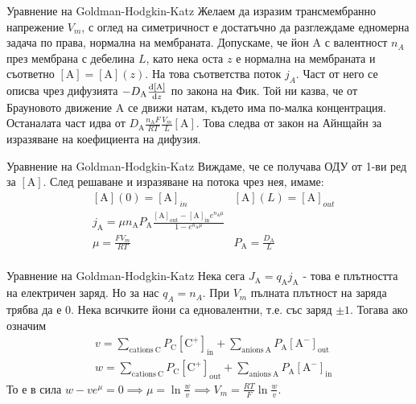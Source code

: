 \begin{frame}[t]{Уравнение на Goldman-Hodgkin-Katz}
    Желаем да изразим трансмембранно напрежение $V_m$, с оглед на симетричност е достатъчно да разглеждаме едномерна задача по права, нормална на мембраната.
    Допускаме, че йон $\mathrm{A}$ с валентност $n_A$ през мембрана с дебелина $L$, като нека оста $z$ е нормална на мембраната и съответно $\left[\mathrm{A}\right]=\left[\mathrm{A}\right](z)$. 
    На това съответства поток $j_A$. Част от него се описва чрез дифузията $-D_{\mathrm{A}}\dv{\left[{\mathrm{A}}\right]}{z}$ по закона на Фик.
    Той ни казва, че от Брауновото движение $\mathrm{A}$ се движи натам, където има по-малка концентрация.
    Останалата част идва от $D_{\mathrm{A}}\frac{n_{\mathrm{A}}F}{RT}\frac{V_m}{L}\left[\mathrm{A}\right]$. 
    Това следва от закон на Айнщайн за изразяване на коефициента на дифузия.
\end{frame}   

\begin{frame}[t]{Уравнение на Goldman-Hodgkin-Katz}
    Виждаме, че се получава ОДУ от 1-ви ред за $\left[\mathrm{A}\right]$. След решаване и изразяване на потока чрез нея, имаме:
    \begin{align*}
        &\left[\mathrm{A}\right](0) = \left[\mathrm{A}\right]_{in} &\left[\mathrm{A}\right](L) = \left[\mathrm{A}\right]_{out} \\
        &j_{\mathrm {A}}=\mu n_{\mathrm {A}}P_{\mathrm{A}}{\frac{\left[\mathrm{A}\right]_{\mathrm {out}}-\left[\mathrm {A}\right]_{\mathrm{in}}e^{n_{\mathrm {A}}\mu}}{1-e^{n_{\mathrm {A}}\mu}}} \\
        &\mu=\frac{FV_m}{RT} &P_{\mathrm{A}}=\frac{D_{\mathrm {A}}}{L}\\
    \end{align*}
\end{frame}

\begin{frame}[t]{Уравнение на Goldman-Hodgkin-Katz}
    Нека сега $J_{\mathrm{A}}=q_{\mathrm{A}}j_{\mathrm{A}}$ - това е плътността на електричен заряд. Но за нас $q_A = n_A$.
    При $V_m$ пълната плътност на заряда трябва да е 0.
    Нека всичките йони са едновалентни, т.е. със заряд $\pm 1$. Тогава ако означим 
    \begin{align*}
        &v=\sum_{{{\mathrm{cations\ C}}}}P_{{{\mathrm{C}}}}\left[{\mathrm{C}}^{{+}}\right]_{{{\mathrm{in}}}}+\sum_{{{\mathrm{anions\ A}}}}P_{{{\mathrm{A}}}}\left[{\mathrm{A}}^{{-}}\right]_{{{\mathrm{out}}}} \\
        &w=\sum_{{{\mathrm{cations\ C}}}}P_{{{\mathrm{C}}}}\left[{\mathrm{C}}^{{+}}\right]_{{{\mathrm{out}}}}+\sum_{{{\mathrm{anions\ A}}}}P_{{{\mathrm{A}}}}\left[{\mathrm{A}}^{{-}}\right]_{{{\mathrm{in}}}} 
    \end{align*}
    То е в сила $w - v e^\mu = 0 \implies \mu = \ln \frac{w}{v} \implies V_m = \frac{RT}{F} \ln \frac{w}{v}$. 
\end{frame}